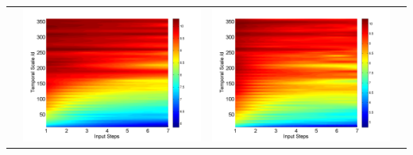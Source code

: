 \documentclass[review]{elsarticle}
\begin{document}
\begin{table}[H]
\begin{tabular}{cccc}
&\begin{minipage}{.3\textwidth}\includegraphics[width=\linewidth]{resultgraph/11532500p_abs.png}\end{minipage}
&\begin{minipage}{.3\textwidth}\includegraphics[width=\linewidth]{resultgraph/11532500pep_abs.png}\end{minipage}

\end{tabular}
\end{table}
\end{document}
